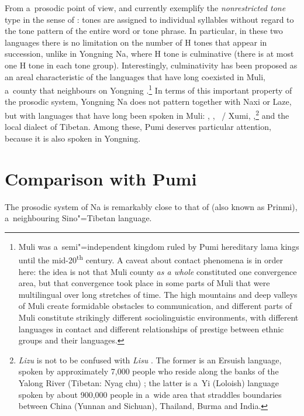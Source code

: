 From a~prosodic point of view,  and  currently exemplify the \textit{nonrestricted tone} type in the sense of \citet{
voorhoeve1973}: tones are assigned to individual syllables without regard to the tone pattern of the entire word or tone phrase. In particular, in these 
two languages there is no limitation on the number of H tones that appear in succession, unlike in Yongning Na, where H tone is culminative (there is 
at most one H tone in each tone group). Interestingly, culminativity has been proposed as an areal characteristic of the languages that have long 
coexisted in Muli, a~county that neighbours on Yongning \citep[160]{chirkova2012}.\footnote{Muli was a~semi"=independent kingdom ruled by 
Pumi hereditary lama kings until the mid-20\textsuperscript{th} century. A caveat about contact phenomena is in order here: the idea is not that Muli 
county \textit{as a whole} constituted one convergence area, but that convergence took place in some parts of Muli that were multilingual over long 
stretches of time. The high mountains and deep valleys of Muli create formidable obstacles to communication, and different parts of Muli constitute 
strikingly different sociolinguistic environments, with different languages in contact and different relationships of prestige between ethnic groups and 
their languages.} In terms of this important property of the prosodic system, Yongning Na does not pattern together with Naxi or Laze, but with 
languages that have long been spoken in Muli: , , ~/ Xumi, ,\footnote{\textit{Lizu} is not to be confused with \textit{Lisu} . The former is an Ersuish language, spoken by approximately 7,000 
people who reside along the banks of the Yalong  River (Tibetan: Nyag chu) \citep{chirkovaetal2012}; the latter is a~Yi (Loloish) language spoken by about 900,000 people in a~wide area that straddles boundaries between China (Yunnan and Sichuan), Thailand, Burma and India.} and the local dialect 
of \ili
{Tibetan}. Among these, Pumi deserves particular attention, because it is also spoken in Yongning.


\section{Comparison with Pumi}
\label{sec:compwithpumi}

The prosodic system of Na is remarkably close to that of  (also known as Prinmi), a~neighbouring Sino"=Tibetan language. 

